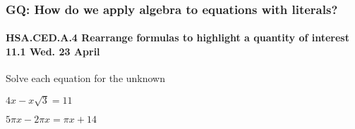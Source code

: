 \documentclass{beamer}
\begin{document}
\frame
{
  \frametitle{GQ: How do we apply algebra to equations with literals?}
  \framesubtitle{HSA.CED.A.4 Rearrange formulas to highlight a quantity of interest \hfill \alert{11.1 Wed. 23 April}}
  \Large{
  Solve each equation for the unknown
  
  \begin{enumerate}%
    \begin{multicols}{2}
      \item $4x-x\sqrt{3}=11$
      \item $5\pi x-2 \pi x= \pi x +14$
    \end{multicols}
    \end{enumerate} \vspace{7cm}
}}
\end{document}
